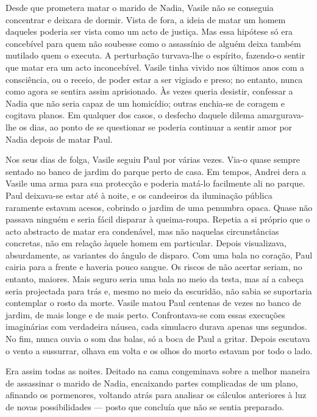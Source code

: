 Desde que prometera matar o marido de Nadia, Vasile não se conseguia
concentrar e deixara de dormir. Vista de fora, a ideia de matar um homem
daqueles poderia ser vista como um acto de justiça. Mas essa hipótese só
era concebível para quem não soubesse como o assassínio de alguém deixa
também mutilado quem o executa. A perturbação turvava-lhe o espírito,
fazendo-o sentir que matar era um acto inconcebível. Vasile tinha vivido
nos últimos anos com a consciência, ou o receio, de poder estar a ser
vigiado e preso; no entanto, nunca como agora se sentira assim
aprisionado. Às vezes queria desistir, confessar a Nadia que não seria
capaz de um homicídio; outras enchia-se de coragem e cogitava planos. Em qualquer dos casos, o desfecho
daquele dilema amargurava-lhe os dias, ao ponto
de se questionar se poderia continuar a sentir amor por Nadia depois de
matar Paul.

Nos seus dias de folga, Vasile seguiu Paul por várias vezes. Via-o quase
sempre sentado no banco de jardim do parque perto de casa. Em tempos,
Andrei dera a Vasile uma arma para sua protecção e poderia matá-lo
facilmente ali no parque. Paul deixava-se estar até à noite, e os
candeeiros da iluminação pública raramente estavam acesos, cobrindo o
jardim de uma penumbra opaca. Quase não passava ninguém e seria fácil
disparar à queima-roupa. Repetia a si próprio que o acto abstracto de
matar era condenável, mas não naquelas circunstâncias concretas, não em
relação àquele homem em particular. Depois visualizava, absurdamente,
as variantes do ângulo de disparo. Com uma bala no coração, Paul cairia
para a frente e haveria pouco sangue. Os riscos de não acertar seriam,
no entanto, maiores. Mais seguro seria uma bala no meio da testa, mas aí
a cabeça seria projectada para trás e, mesmo no meio da escuridão, não
sabia se suportaria contemplar o rosto da morte. Vasile matou Paul
centenas de vezes no banco de jardim, de mais longe e de mais perto.
Confrontava-se com essas execuções imaginárias com verdadeira náusea, cada simulacro durava apenas uns segundos. No fim, nunca ouvia o
som das balas, só a boca de Paul a gritar. Depois escutava o vento a
sussurrar, olhava em volta e os olhos do morto estavam por todo o lado.

Era assim todas as noites. Deitado na cama congeminava sobre a melhor
maneira de assassinar o marido de Nadia, encaixando partes complicadas
de um plano, afinando os pormenores, voltando atrás para analisar os
cálculos anteriores à luz de novas possibilidades --- posto que concluía
que não se sentia preparado.

